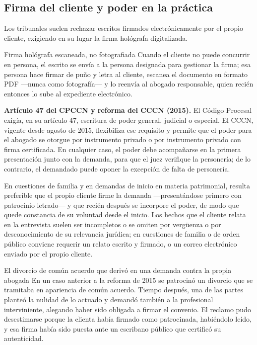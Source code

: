 \documentclass[12pt,oneside]{book}
\begin{document}
\subsection{Firma del cliente y poder en la práctica}

Los tribunales suelen rechazar escritos firmados electrónicamente por el propio cliente, exigiendo en su lugar la firma hológrafa digitalizada.

\begin{example}{Firma hológrafa escaneada, no fotografiada}
Cuando el cliente no puede concurrir en persona, el escrito se envía a la persona designada para gestionar la firma; esa persona hace firmar de puño y letra al cliente, escanea el documento en formato PDF ---nunca como fotografía--- y lo reenvía al abogado responsable, quien recién entonces lo sube al expediente electrónico.
\end{example}

\begin{important}
\textbf{Artículo 47 del CPCCN y reforma del CCCN (2015).} El Código Procesal exigía, en su artículo 47, escritura de poder general, judicial o especial. El CCCN, vigente desde agosto de 2015, flexibiliza ese requisito y permite que el poder para el abogado se otorgue por instrumento privado o por instrumento privado con firma certificada. En cualquier caso, el poder debe acompañarse en la primera presentación junto con la demanda, para que el juez verifique la personería; de lo contrario, el demandado puede oponer la excepción de falta de personería.
\end{important}

En cuestiones de familia y en demandas de inicio en materia patrimonial, resulta preferible que el propio cliente firme la demanda ---presentándose primero con patrocinio letrado--- y que recién después se incorpore el poder, de modo que quede constancia de su voluntad desde el inicio. Los hechos que el cliente relata en la entrevista suelen ser incompletos o se omiten por vergüenza o por desconocimiento de su relevancia jurídica; en cuestiones de familia o de orden público conviene requerir un relato escrito y firmado, o un correo electrónico enviado por el propio cliente.

\begin{example}{El divorcio de común acuerdo que derivó en una demanda contra la propia abogada}
En un caso anterior a la reforma de 2015 se patrocinó un divorcio que se tramitaba en apariencia de común acuerdo. Tiempo después, una de las partes planteó la nulidad de lo actuado y demandó también a la profesional interviniente, alegando haber sido obligada a firmar el convenio. El reclamo pudo desestimarse porque la clienta había firmado como patrocinada, habiéndolo leído, y esa firma había sido puesta ante un escribano público que certificó su autenticidad.
\end{example}
\end{document}
